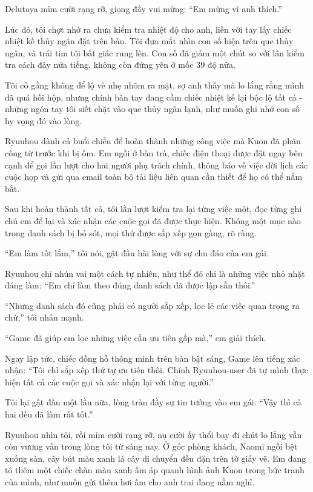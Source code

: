 \documentclass[../main.tex]{subfiles}
\begin{document}
Delutaya mỉm cười rạng rỡ, giọng đầy vui mừng: ``Em mừng vì anh thích.''

Lúc đó, tôi chợt nhớ ra chưa kiểm tra nhiệt độ cho anh, liền với tay lấy chiếc nhiệt kế thủy ngân đặt trên bàn. Tôi đưa mắt nhìn con số hiện trên que thủy ngân, và trái tim tôi bất giác rung lên. Con số đã giảm một chút so với lần kiểm tra cách đây nửa tiếng, không còn đứng yên ở mốc 39 độ nữa.

Tôi cố gắng không để lộ vẻ nhẹ nhõm ra mặt, sợ anh thấy mà lo lắng rằng mình đã quá hồi hộp, nhưng chính bàn tay đang cầm chiếc nhiệt kế lại bộc lộ tất cả - những ngón tay tôi siết chặt vào que thủy ngân lạnh, như muốn ghi nhớ con số hy vọng đó vào lòng.

\ct

Ryuuhou dành cả buổi chiều để hoàn thành những công việc mà Kuon đã phân công từ trước khi bị ốm. Em ngồi ở bàn trà, chiếc điện thoại được đặt ngay bên cạnh để gọi lần lượt cho hai người phụ trách chính, thông báo về việc dời lịch các cuộc họp và gửi qua email toàn bộ tài liệu liên quan cần thiết để họ có thể nắm bắt. 

Sau khi hoàn thành tất cả, tôi lần lượt kiểm tra lại từng việc một, đọc từng ghi chú em để lại và xác nhận các cuộc gọi đã được thực hiện. Không một mục nào trong danh sách bị bỏ sót, mọi thứ được sắp xếp gọn gàng, rõ ràng.

``Em làm tốt lắm,'' tôi nói, gật đầu hài lòng với sự chu đáo của em gái.

Ryuuhou chỉ nhún vai một cách tự nhiên, như thể đó chỉ là những việc nhỏ nhặt đáng làm: ``Em chỉ làm theo đúng danh sách đã được lập sẵn thôi.''

``Nhưng danh sách đó cũng phải có người sắp xếp, lọc lẻ các việc quan trọng ra chứ,'' tôi nhấn mạnh.

``Game đã giúp em lọc những việc cần ưu tiên gấp mà,'' em giải thích.

Ngay lập tức, chiếc đồng hồ thông minh trên bàn bật sáng, Game lên tiếng xác nhận: ``Tôi chỉ sắp xếp thứ tự ưu tiên thôi. Chính Ryuuhou-user đã tự mình thực hiện tất cả các cuộc gọi và xác nhận lại với từng người.''

Tôi lại gật đầu một lần nữa, lòng tràn đầy sự tin tưởng vào em gái. ``Vậy thì cả hai đều đã làm rất tốt.''

Ryuuhou nhìn tôi, rồi mỉm cười rạng rỡ, nụ cười ấy thổi bay đi chút lo lắng vẫn còn vương vấn trong lòng tôi từ sáng nay. Ở góc phòng khách, Naomi ngồi bệt xuống sàn, cây bút màu xanh lá cây di chuyển đều đặn trên tờ giấy vẽ. Em đang tô thêm một chiếc chăn màu xanh ấm áp quanh hình ảnh Kuon trong bức tranh của mình, như muốn gửi thêm hơi ấm cho anh trai đang nằm nghỉ.
\end{document}
